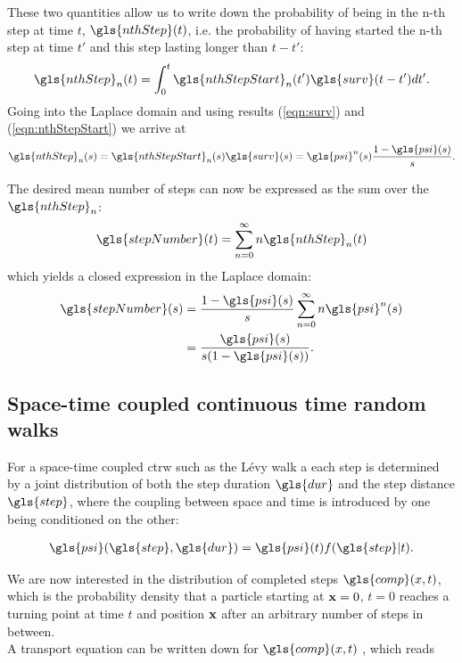 These two quantities allow us to write down the probability of being in the n-th step at time $t$, $\gls{nthStep}(t)$, i.e. the probability of having started the n-th step at time $t'$ and this step lasting longer than $t-t'$:
%
\begin{align}
\gls{nthStep}_n(t) = \int_{0}^{t} \gls{nthStepStart}_{n}(t') \gls{surv}(t-t') dt' .
\end{align}
%
Going into the Laplace domain and using results (\ref{eqn:surv}) and (\ref{eqn:nthStepStart}) we arrive at 
%
\begin{align}
\gls{nthStep}_n(s) =  \gls{nthStepStart}_{n}(s) \gls{surv}(s) = \gls{psi}^{n}(s)  \frac{1-\gls{psi}(s)}{s} .
\end{align}

The desired mean number of steps can now be expressed as the sum over the $\gls{nthStep}_n$:
%
\begin{align}
\gls{stepNumber}(t) = \sum_{n=0}^{\infty} n \gls{nthStep}_n(t)
\end{align}
%
which yields a closed expression in the Laplace domain:
%
\begin{align}
\gls{stepNumber}(s) & = \frac{1-\gls{psi}(s)}{s} \sum_{n=0}^{\infty} n \gls{psi}^{n}(s) \\
& =  \frac{\gls{psi}(s)}{s(1-\gls{psi}(s))} .
\end{align}



\subsection{Space-time coupled continuous time random walks}


For a space-time coupled \gls{ctrw} such as the L\'evy walk a each step is determined by a joint distribution of both the step duration $\gls{dur}$ and the step distance $\gls{step}$, where the coupling between space and time is introduced by one being conditioned on the other:

\begin{align}
\gls{psi}(\gls{step}, \gls{dur}) = \gls{psi}(t) f(\gls{step}|t) .
\end{align}

We are now interested in the distribution of completed steps $\gls{comp}(x,t)$, which is the probability density that a particle starting at $\mathbf{ x }=0$, $t=0$ reaches a turning point at time $t$ and position $\mathbf{ x }$ after an arbitrary number of steps in between. \\
A transport equation can be written down for $\gls{comp}(x,t)$ \cite{firstSteps}, which reads

